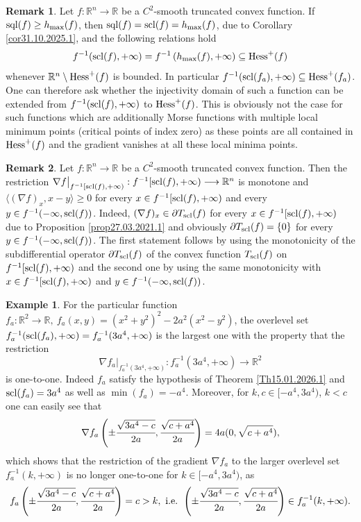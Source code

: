 \documentclass[12pt,twoside,reqno]{amsart}
\theoremstyle{definition}
\newtheorem{example}{Example}[section]
\newtheorem{remark}{Remark}[section]
\numberwithin{equation}{section}
\begin{document}
\begin{remark}
Let $f:\mathbb{R}^n\longrightarrow\mathbb{R}$ be a $C^2$-smooth truncated convex function. If ${\rm sql}(f)\geq h_{\max}(f)$, 
then ${\rm sql}(f)={\rm scl}(f)=h_{\max}(f)$, due to Corollary \ref{cor31.10.2025.1}, and the following relations hold
\[f^{-1}({\rm scl}(f),+\infty)=f^{-1}\left(h_{\max}(f),+\infty\right)\subseteq {\rm Hess}^+(f)\]
whenever $\mathbb{R}^n\setminus {\rm Hess}^+(f)$ is bounded. In particular $f^{-1}({\rm scl}(f_a),+\infty)\subseteq {\rm Hess}^+(f_a)$.
One can therefore ask whether the injectivity domain of such a function can be extended from $f^{-1}({\rm scl}(f),+\infty)$ to ${\rm Hess}^+(f)$.
This is obviously not the case for such functions which are additionally Morse functions with multiple local minimum points (critical points of index zero) as these points 
are all contained in ${\rm Hess}^+(f)$ and the gradient vanishes at all these local minima points.
\end{remark}
\begin{remark}
Let $f:\mathbb{R}^n\longrightarrow\mathbb{R}$ be a $C^2$-smooth truncated convex function.
Then the restriction $\nabla f\big|_{f^{-1}[{\rm scl}(f),+\infty)}:f^{-1}[{\rm scl}(f),+\infty)\longrightarrow\mathbb{R}^n$
is monotone and $\langle (\nabla f)_x,x-y\rangle\geq 0$ for every $x\in f^{-1}[{\rm scl}(f),+\infty)$ and every $y\in f^{-1}(-\infty,{\rm scl}(f))$. 
Indeed, $(\nabla f)_x\in \partial T_{\rm scl}(f)$ for every $x\in f^{-1}[{\rm scl}(f),+\infty)$ due to Proposition \ref{prop27.03.2021.1} and obviously 
$\partial T_{\rm scl}(f)=\{0\}$ for every $y\in f^{-1}(-\infty,{\rm scl}(f))$. The first statement follows by using the monotonicity of
the subdifferential operator $\partial T_{\rm scl}(f)$ of the convex function $T_{\rm scl}(f)$ on $f^{-1}[{\rm scl}(f),+\infty)$ and the second one by using the same monotonicity 
with $x\in f^{-1}[{\rm scl}(f),+\infty)$ and $y\in f^{-1}(-\infty,{\rm scl}(f))$.
\end{remark}
\begin{example}\label{ex05.02.2026.1}
For the particular function $f_a:\mathbb{R}^2\longrightarrow\mathbb{R}, \ f_a(x,y)=(x^2+y^2)^2-2a^2(x^2-y^2)$, the overlevel set $f_a^{-1}({\rm scl}(f_a),+\infty)=f_a^{-1}(3a^4,+\infty)$ is the largest one with the property that the restriction 
\[\nabla f_a\big|_{f_a^{-1}(3a^4,+\infty)}:f_a^{-1}(3a^4,+\infty)\longrightarrow\mathbb{R}^2\]
is one-to-one. Indeed $f_a$ satisfy the hypothesis of Theorem \ref{Th15.01.2026.1} and ${\rm scl}(f_a)=3a^4$ as well as $\min(f_a)=-a^4$. Moreover, for $k,c\in[-a^4,3a^4)$, $k<c$ one can easily see that 
\[
\nabla f_a\left(\pm\cfrac{\sqrt{3a^4-c}}{2a},\cfrac{\sqrt{c+a^4}}{2a}\right)=4a(0,\sqrt{c+a^4}),
\]
which shows that the restriction 
of the gradient $\nabla f_a$ to the larger overlevel set $f_a^{-1}(k,+\infty)$ is no longer one-to-one for  $k\in[-a^4,3a^4)$, as
\[
 f_a\left(\pm\cfrac{\sqrt{3a^4-c}}{2a},\cfrac{\sqrt{c+a^4}}{2a}\right)=c>k, \mbox{ i.e. } \left(\pm\cfrac{\sqrt{3a^4-c}}{2a},\cfrac{\sqrt{c+a^4}}{2a}\right)\in f_a^{-1}(k,+\infty).
\]
\end{example}
\end{document}
